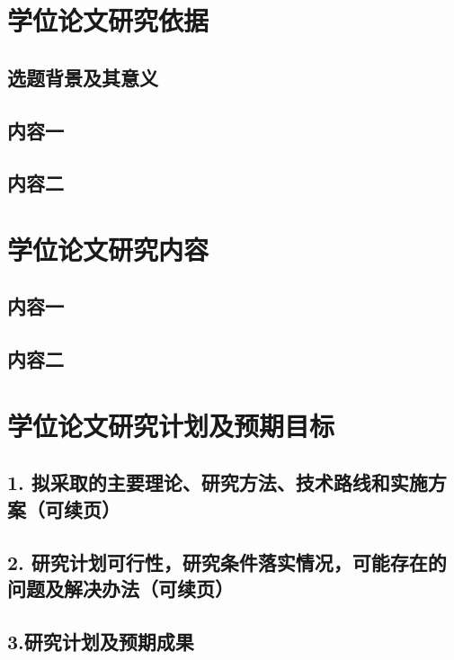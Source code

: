 \documentclass{article}
\begin{document}
\section{学位论文研究依据}
\subsection{选题背景及其意义}
\subsection{内容一}
\subsection{内容二}

\section{学位论文研究内容}
\subsection{内容一}
\subsection{内容二}



\section{学位论文研究计划及预期目标}
\subsection*{1. 拟采取的主要理论、研究方法、技术路线和实施方案（可续页）}

\npubreak

\subsection*{2. 研究计划可行性，研究条件落实情况，可能存在的问题及解决办法（可续页）}



\subsection*{3.研究计划及预期成果}
\end{document}
